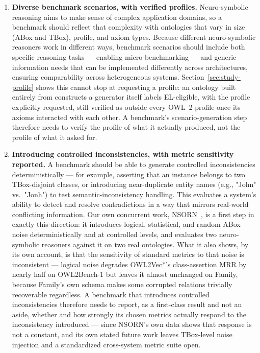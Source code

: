 \begin{enumerate}
    \item \textbf{Diverse benchmark scenarios, with verified profiles.} Neuro-symbolic reasoning aims to make sense of complex application domains, so a benchmark should reflect that complexity with ontologies that vary in size (ABox and TBox), profile, and axiom types. Because different neuro-symbolic reasoners work in different ways, benchmark scenarios should include both specific reasoning tasks — enabling micro-benchmarking — and generic information needs that can be implemented differently across architectures, ensuring comparability across heterogeneous systems. Section~\ref{sec:study-profile} shows this cannot stop at requesting a profile: an ontology built entirely from constructs a generator itself labels EL-eligible, with the profile explicitly requested, still verified as outside every OWL~2 profile once its axioms interacted with each other. A benchmark's scenario-generation step therefore needs to verify the profile of what it actually produced, not the profile of what it asked for.

    \item \label{item:inconsistency} \textbf{Introducing controlled inconsistencies, with metric sensitivity reported.} A benchmark should be able to generate controlled inconsistencies deterministically — for example, asserting that an instance belongs to two TBox-disjoint classes, or introducing near-duplicate entity names (e.g., "John" vs.\ "Jonh") to test semantic-inconsistency handling. This evaluates a system's ability to detect and resolve contradictions in a way that mirrors real-world conflicting information. Our own concurrent work, NSORN~\cite{loesch2024nsorn}, is a first step in exactly this direction: it introduces logical, statistical, and random ABox noise deterministically and at controlled levels, and evaluates two neuro-symbolic reasoners against it on two real ontologies. What it also shows, by its own account, is that the sensitivity of standard metrics to that noise is inconsistent — logical noise degrades OWL2Vec*'s class-assertion MRR by nearly half on OWL2Bench-1 but leaves it almost unchanged on Family, because Family's own schema makes some corrupted relations trivially recoverable regardless. A benchmark that introduces controlled inconsistencies therefore needs to report, as a first-class result and not an aside, whether and how strongly its chosen metrics actually respond to the inconsistency introduced — since NSORN's own data shows that response is not a constant, and its own stated future work leaves TBox-level noise injection and a standardized cross-system metric suite open.


\end{enumerate}
